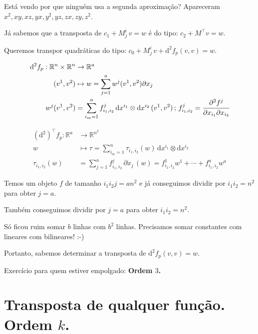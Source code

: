 \documentclass[12pt]{article}
\begin{document}
Est\'a vendo por que ningu\'em usa a segunda aproxima\c{c}\~ao? Apareceram $x^2, xy, xz, yx, y^2, yz, zx, zy, z^2$.

J\'a sabemos que a transposta de $c_1 + M^i_j\,v = w$ \'e do tipo: $c_2 + M^\top v = w$.

Queremos transpor quadr\'aticas do tipo: $c_0 + M^i_j\,v + \mathrm{d}^2 f_p (v, v) = w$.

\begin{align}
	\mathrm{d}^2f_p : \mathbb{R}^n \times \mathbb{R}^n &\rightarrow \mathbb{R}^a \\
	(v^1, v^2) &\mapsto w = \sum_{j = 1}^a w^j(v^1, v^2) \partial x_j \\
	w^j(v^1, v^2) &= \sum_{i_m = 1}^n f_{i_1, i_2}^j\, \mathrm{d}x^{i_1} \otimes \mathrm{d}x^{i_2}\,(v^1, v^2)\,;\,f^j_{i_1, i_2} = \cfrac{\partial^2 f^j}{\partial x_{i_1} \partial x_{i_2}}
\end{align}

\begin{align}
	(\mathrm{d}^2)^\top f_p : \mathbb{R}^a &\rightarrow \mathbb{R}^{n^2} \\
	w &\mapsto \tau = \sum_{i_m = 1}^n \tau_{i_1, i_2}(w)\, \mathrm{d}x^{i_1} \otimes \mathrm{d}x^{i_2} \\
	\tau_{i_1, i_2} (w) &= \sum_{j = 1}^a f_{i_1, i_2}^j\, \partial x_j\,(w) = f_{i_1, i_2}^1 w^1 + \cdots + f_{i_1, i_2}^a w^a
\end{align}

Temos um objeto $f$ de tamanho $i_1i_2j = an^2$ e j\'a conseguimos dividir por $i_1i_2 = n^2$ para obter $j = a$.

Tamb\'em conseguimos dividir por $j = a$ para obter $i_1i_2 = n^2$.

S\'o ficou ruim somar $b$ linhas com $b^2$ linhas. Precisamos somar constantes com lineares com bilineares! :-)

Portanto, sabemos determinar a transposta de $\mathrm{d}^2 f_p (v, v) = w$.

Exerc\'icio para quem estiver empolgado: \textbf{Ordem $3$.}

\section{Transposta de qualquer fun\c{c}\~ao. Ordem $k$.}
\end{document}
